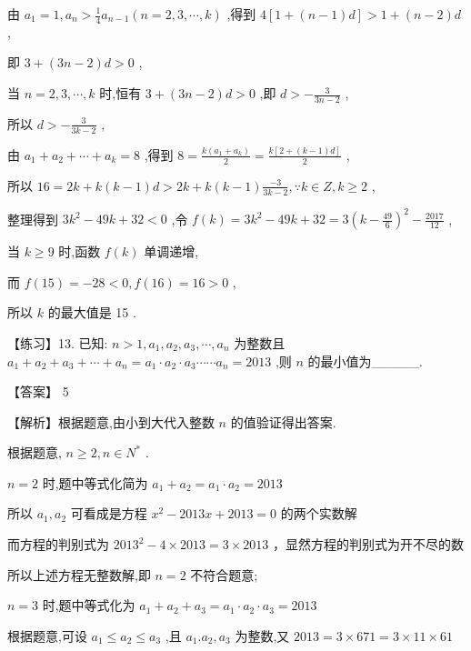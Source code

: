 \documentclass[10pt]{article}
\begin{document}
由 \({a}_{1} = 1,{a}_{n} > \frac{1}{4}{a}_{n - 1}\left( {n = 2,3,\cdots ,k}\right)\) ,得到 \(4\left\lbrack  {1 + \left( {n - 1}\right) d}\right\rbrack   > 1 + \left( {n - 2}\right) d\) ,

即 \(3 + \left( {{3n} - 2}\right) d > 0\) ,

当 \(n = 2,3,\cdots ,k\) 时,恒有 \(3 + \left( {{3n} - 2}\right) d > 0\) ,即 \(d >  - \frac{3}{{3n} - 2}\) ,

所以 \(d >  - \frac{3}{{3k} - 2}\) ,

由 \({a}_{1} + {a}_{2} + \cdots  + {a}_{k} = 8\) ,得到 \(8 = \frac{k\left( {{a}_{1} + {a}_{k}}\right) }{2} = \frac{k\left\lbrack  {2 + \left( {k - 1}\right) d}\right\rbrack  }{2}\) ,

所以 \({16} = {2k} + k\left( {k - 1}\right) d > {2k} + k\left( {k - 1}\right) \frac{-3}{{3k} - 2},\because k \in  Z,k \geq  2\) ,

整理得到 \(3{k}^{2} - {49k} + {32} < 0\) ,令 \(f\left( k\right)  = 3{k}^{2} - {49k} + {32} = 3{\left( k - \frac{49}{6}\right) }^{2} - \frac{2017}{12}\) ,

当 \(k \geq  9\) 时,函数 \(f\left( k\right)\) 单调递增,

而 \(f\left( {15}\right)  =  - {28} < 0,f\left( {16}\right)  = {16} > 0\) ,

所以 \(k\) 的最大值是 15 .

【练习】13. 已知: \(n > 1,{a}_{1},{a}_{2},{a}_{3},\cdots ,{a}_{n}\) 为整数且 \({a}_{1} + {a}_{2} + {a}_{3} + \cdots  + {a}_{n} = {a}_{1} \cdot  {a}_{2} \cdot  {a}_{3}\cdots \cdots {a}_{n} = {2013}\) ,则 \(n\) 的最小值为\_\_\_\_\_.

【答案】 5

【解析】根据题意,由小到大代入整数 \(n\) 的值验证得出答案.

根据题意, \(n \geq  2,n \in  {N}^{ * }\) .

\(n = 2\) 时,题中等式化简为 \({a}_{1} + {a}_{2} = {a}_{1} \cdot  {a}_{2} = {2013}\)

所以 \({a}_{1},{a}_{2}\) 可看成是方程 \({x}^{2} - {2013x} + {2013} = 0\) 的两个实数解

而方程的判别式为 \({2013}^{2} - 4 \times  {2013} = 3 \times  {2013}\) ，显然方程的判别式为开不尽的数

所以上述方程无整数解,即 \(n = 2\) 不符合题意;

\(n = 3\) 时,题中等式化为 \({a}_{1} + {a}_{2} + {a}_{3} = {a}_{1} \cdot  {a}_{2} \cdot  {a}_{3} = {2013}\)

根据题意,可设 \({a}_{1} \leq  {a}_{2} \leq  {a}_{3}\) ,且 \({a}_{1}.{a}_{2},{a}_{3}\) 为整数,又 \({2013} = 3 \times  {671} = 3 \times  {11} \times  {61}\)
\end{document}

